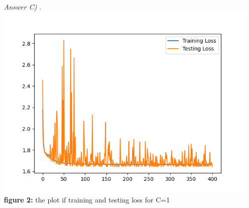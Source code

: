 \documentclass{article}
\theoremstyle{definition}
\theoremstyle{remark}
\begin{document}
\begin{enumerate}[font={\Large\bfseries}]
         
        	\begin{itemize}
        	\item[\textit{Answer C)}].\\
			\centering
        		\includegraphics[scale=0.6]{loss_c_1.png}\\
			\textbf{figure 2:} the plot if training and testing loss for C=1\\
        	\end{itemize}
		
	\end{enumerate}

\newpage



\end{document}
